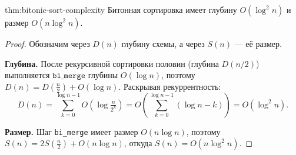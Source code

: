 \begin{Theorem}{}{thm:bitonic-sort-complexity}
	Битонная сортировка имеет глубину $O(\log^2 n)$ и размер $O(n\log^2 n)$.
\end{Theorem}

\begin{proof}
	Обозначим через $D(n)$ глубину схемы, а через $S(n)$ --- её размер.
	
	\textbf{Глубина.}
	После рекурсивной сортировки половин (глубина $D(n/2)$) выполняется $\texttt{bi\_merge}$ глубины $O(\log n)$, поэтому $D(n)=D\!\left(\tfrac{n}{2}\right)+O(\log n)$. Раскрывая рекуррентность:
	\[
	D(n)=\sum_{k=0}^{\log n - 1} O\!\left(\log\tfrac{n}{2^k}\right)
	= O\!\left(\sum_{k=0}^{\log n - 1}(\log n - k)\right)
	= O(\log^2 n).
	\]
	
	\textbf{Размер.}
	Шаг \texttt{bi\_merge} имеет размер $O(n\log n)$, поэтому $S(n)=2S\!\left(\tfrac{n}{2}\right)+O(n\log n)$, откуда $S(n)=O(n\log^2 n)$.
\end{proof}

